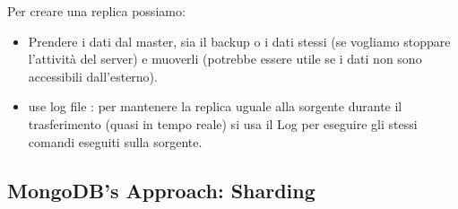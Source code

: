 \documentclass[a4page, 11pt]{article}
\begin{document}
Per creare una replica possiamo:
\begin{itemize}[noitemsep] %
	\item Prendere i dati dal master, sia il backup o i dati stessi (se vogliamo stoppare l'attività del server) e muoverli (potrebbe essere utile se i dati non sono accessibili dall'esterno).
	\item use log file : per mantenere la replica uguale alla sorgente durante il trasferimento (quasi in tempo reale) si usa il Log per eseguire gli stessi comandi eseguiti sulla sorgente.
\end{itemize}


\subsection{MongoDB's Approach: Sharding\cite{ScalingMongoDB}}
\end{document}
